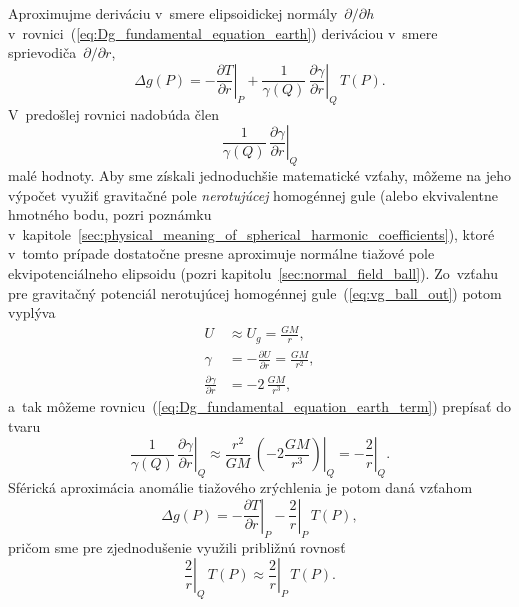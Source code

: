 \documentclass[a4paper, 12pt]{book}
\begin{document}
Aproximujme deriváciu v~smere elipsoidickej normály~$\partial \slash \partial 
h$ v~rovnici~(\ref{eq:Dg_fundamental_equation_earth}) deriváciou v~smere 
sprievodiča~$\partial \slash \partial r$,
%
\begin{equation}
\Delta g(P) = -\left.\frac{\partial T}{\partial r}\right|_{P} 
+ \frac{1}{\gamma(Q)} \, \left.\frac{\partial \gamma}{\partial r}\right|_{Q} \, 
T(P){.}
\end{equation}
%
V~predošlej rovnici nadobúda člen
%
\begin{equation}
\label{eq:Dg_fundamental_equation_earth_term}
\left.\frac{1}{\gamma(Q)} \, \frac{\partial \gamma}{\partial r}\right|_Q
\end{equation}
%
malé hodnoty.  Aby sme získali jednoduchšie matematické vzťahy, môžeme na jeho 
výpočet využiť gravitačné pole \emph{nerotujúcej} homogénnej gule (alebo 
ekvivalentne hmotného bodu, pozri poznámku 
v~kapitole~\ref{sec:physical_meaning_of_spherical_harmonic_coefficients}), 
ktoré v~tomto prípade dostatočne presne aproximuje normálne tiažové pole 
ekvipotenciálneho elipsoidu (pozri kapitolu~\ref{sec:normal_field_ball}).  
Zo~vzťahu pre gravitačný potenciál nerotujúcej homogénnej 
gule~(\ref{eq:vg_ball_out}) potom vyplýva
%
\begin{align}
U &\approx U_g = \frac{GM}{r}{,}\\
%
\gamma &= -\frac{\partial U}{\partial r} = \frac{GM}{r^2}{,}\\
%
\frac{\partial \gamma}{\partial r} &= -2 \, \frac{GM}{r^3}{,}
\end{align}
%
a~tak môžeme rovnicu~(\ref{eq:Dg_fundamental_equation_earth_term}) prepísať do 
tvaru
%
\begin{equation}
\left.\frac{1}{\gamma(Q)} \, \frac{\partial \gamma}{\partial r}\right|_Q 
\approx \left.\frac{r^2}{GM} \, \left( -2\frac{GM}{r^3} \right)\right|_Q 
= -\left.\frac{2}{r}\right|_Q {.}
\end{equation}
%
Sférická aproximácia anomálie tiažového zrýchlenia je potom daná vzťahom
%
\begin{equation}
\label{eq:Dg_fundamental_equation_earth_sph}
\Delta g(P) = -\left.\frac{\partial T}{\partial r}\right|_{P} 
- \left.\frac{2}{r}\right|_{P} \, T(P){,}
\end{equation}
%
pričom sme pre zjednodušenie využili približnú rovnosť
%
\begin{equation}
\left.\frac{2}{r}\right|_Q \, T(P) \approx \left.\frac{2}{r}\right|_P \, 
T(P){.}
\end{equation}
\end{document}
